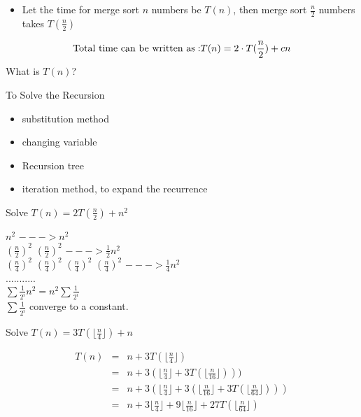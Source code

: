 \documentclass{beamer}
\begin{document}
\begin{frame}{}
\begin{itemize}
\item Let the time for merge sort $n$ numbers be $T(n)$, then merge
 sort $\frac{n}{2}$ numbers takes $T(\frac{n}{2})$
\end{itemize}
$${\rm Total\ time\ can\ be\ written\ as: } T(n)=2\cdot T(\frac{n}{2})+cn$$
 What is $T(n)$?
\end{frame}

\begin{frame}{}
\begin{center}
To Solve the Recursion
\end{center}
\begin{itemize}
\item substitution method
\item changing variable
\item Recursion tree
\item iteration method, to expand the recurrence
\end{itemize}
\end{frame}

\begin{frame}{}
\begin{center}
{\large Solve $T(n)=2T(\frac{n}{2}) +n^2$}

$n^2$ $--->n^2$\\
$(\frac{n}{2})^2$ $(\frac{n}{2})^2$ $--->\frac{1}{2}n^2$\\
$(\frac{n}{4})^2$ $(\frac{n}{4})^2$ $(\frac{n}{4})^2$ $(\frac{n}{4})^2$ $--->
  \frac{1}{4}n^2$ \\
...........\\
$\sum\frac{1}{2^i}n^2 = n^2\sum\frac{1}{2^i}$ \\
$\sum\frac{1}{2^i}$ converge to a constant.
\end{center}
\end{frame}

\begin{frame}{}
\begin{center}
{\large Solve $T(n) = 3 T(\lfloor \frac{n}{4}\rfloor)+n$}
\end{center}
\begin{eqnarray*}
T(n)& = &n+3T(\lfloor \frac{n}{4}\rfloor) \\
    &=& n+3(\lfloor \frac{n}{4}\rfloor+3T(\lfloor \frac{n}{16}\rfloor)))\\
    &=& n+3(\lfloor \frac{n}{4}\rfloor +3(\lfloor \frac{n}{16}\rfloor
      + 3T(\lfloor \frac{n}{64}\rfloor)))\\
    &=& n+3\lfloor \frac{n}{4}\rfloor + 9\lfloor \frac{n}{16} \rfloor+ 
      27 T(\lfloor \frac{n}{64}\rfloor)
\end{eqnarray*}
\end{frame}
\end{document}
